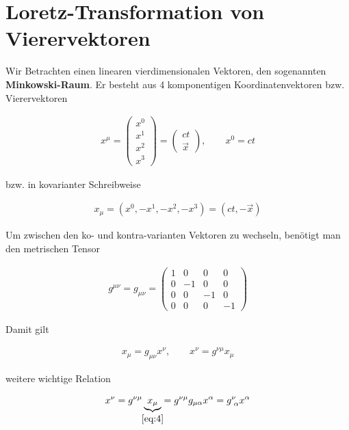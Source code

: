
\usepackage{amsmath} 





\section*{Loretz-Transformation von Vierervektoren}


Wir Betrachten einen linearen vierdimensionalen Vektoren, den sogenannten  \textbf{Minkowski-Raum}. Er besteht aus 4 komponentigen Koordinatenvektoren bzw. Vierervektoren

\begin{align}
  \label{eq:1}
  x^\mu = \begin{pmatrix}x^0\\x^1\\ x^2\\x^3 \end{pmatrix} = \begin{pmatrix}ct \\\vec x \end{pmatrix}, \qquad x^0=ct
\end{align}

bzw. in kovarianter Schreibweise

\begin{align}
  \label{eq:2}
  x_\mu = (x^0,-x^1,-x^2,-x^3) = (ct,-\vec x)
\end{align}

Um zwischen den ko- und kontra-varianten Vektoren zu wechseln, benötigt man den metrischen Tensor

\begin{align}
  \label{eq:3}
  g^{\mu\nu} = g_{\mu\nu} = \begin{pmatrix} 1&0&0&0 \\  0&-1&0&0 \\ 0&0&-1&0 \\ 0&0&0&-1  \end{pmatrix}
\end{align}


Damit gilt

\begin{align}
  \label{eq:4}
  x_{\mu} = g_{\mu\nu}x^\nu, \qquad x^\nu = g^{\nu\mu}x_\mu
\end{align}

weitere wichtige Relation

\begin{align}
  \label{eq:5}
  x^\nu = g^{\nu\mu}\underbr{x_\mu}_{\eqref{eq:4}} = g^{\nu\mu}  g_{\mu\alpha}x^\alpha = g^\nu_{\,\,\alpha}x^{\alpha}
\end{align}

